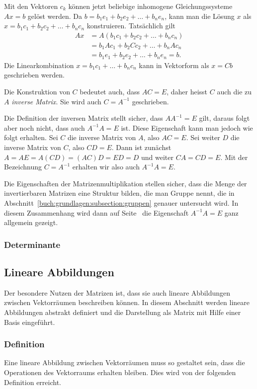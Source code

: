 Mit den Vektoren $c_k$ können jetzt beliebige inhomogene Gleichungssysteme
$Ax=b$ gelöst werden.
Da $b = b_1e_1 + b_2e_2 + \dots + b_ne_n$, kann man die Lösung $x$ als
$x = b_1c_1+b_2c_2+\dots+b_nc_n$ konstruieren.
Tatsächlich gilt
\begin{align*}
Ax
&= 
A( b_1c_1+b_2c_2+\dots+b_nc_n)
\\
&=
b_1Ac_1 + b_2Cc_2 + \dots + b_nAc_n
\\
&=
b_1e_1 + b_2e_2 + \dots + b_ne_n
=
b.
\end{align*}
Die Linearkombination $x=b_1c_1+\dots+b_nc_n$ kann in Vektorform als $x=Cb$
geschrieben werden.

Die Konstruktion von $C$ bedeutet auch, dass $AC=E$, daher heisst $C$ auch
die zu $A$ {\em inverse Matrix}.
Sie wird auch $C=A^{-1}$ geschrieben.

Die Definition der inversen Matrix stellt sicher, dass $AA^{-1}=E$ gilt,
daraus folgt aber noch nicht, dass auch $A^{-1}A=E$ ist.
Diese Eigenschaft kann man jedoch wie folgt erhalten.
Sei $C$ die inverse Matrix von $A$, also $AC=E$.
Sei weiter $D$ die inverse Matrix von $C$, also $CD=E$.
Dann ist zunächst $A=AE=A(CD)=(AC)D=ED=D$ und weiter
$CA=CD=E$.
Mit der Bezeichnung $C=A^{-1}$ erhalten wir also auch $A^{-1}A=E$.

Die Eigenschaften der Matrizenmultiplikation stellen sicher,
dass die Menge der invertierbaren Matrizen eine Struktur bilden,
die man Gruppe nennt, die in Abschnitt~\ref{buch:grundlagen:subsection:gruppen}
genauer untersucht wird.
In diesem Zusammenhang wird dann auf
Seite~\pageref{buch:vektorenmatrizen:satz:gruppenregeln}
die Eigenschaft $A^{-1}A=E$ ganz allgemein gezeigt.

\subsubsection{Determinante}

%
%
\subsection{Lineare Abbildungen
\label{buch:grundlagen:subsection:lineare-abbildungen}}
Der besondere Nutzen der Matrizen ist, dass sie auch lineare Abbildungen
zwischen Vektorräumen beschreiben können.
In diesem Abschnitt werden lineare Abbildungen abstrakt definiert
und die Darstellung als Matrix mit Hilfe einer Basis eingeführt.


\subsubsection{Definition}
Eine lineare Abbildung zwischen Vektorräumen muss so gestaltet sein,
dass die Operationen des Vektorraums erhalten bleiben.
Dies wird von der folgenden Definition erreicht.

